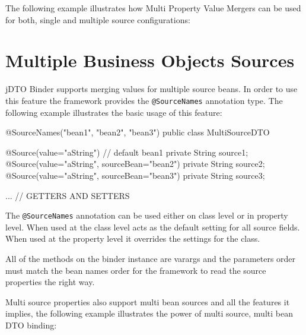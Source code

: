 \documentclass[11pt]{article}
\newcommand{\JDTO}{jDTO Binder\xspace}
\begin{document}
The following example illustrates how Multi Property Value Mergers can be used for both, single and multiple source configurations:



\clearpage

\section{Multiple Business Objects Sources}

\JDTO supports merging values for multiple source beans. In order to use this feature the framework provides the \texttt{@SourceNames} annotation type. The following example illustrates the basic usage of this feature:



\begin{java}
@SourceNames({"bean1", "bean2", "bean3"})
public class MultiSourceDTO {
    
    @Source(value="aString") // default bean1
    private String source1;
    @Source(value="aString", sourceBean="bean2")
    private String source2;
    @Source(value="aString", sourceBean="bean3")
    private String source3;
    
    ... // GETTERS AND SETTERS
}
\end{java}

The \texttt{@SourceNames} annotation can be used either on class level or in property level. When used at the class level acts as the default setting for all source fields. When used at the property level it overrides the settings for the class.

All of the methods on the binder instance are varargs and the parameters order must match the bean names order for the framework to read the source properties the right way.

Multi source properties also support multi bean sources and all the features it implies, the following example illustrates the power of multi source, multi bean DTO binding:
\end{document}
